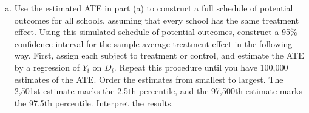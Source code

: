 \documentclass[11pt,notitlepage]{article}\usepackage[]{graphicx}\usepackage[]{color}
\makeatletter
\newenvironment{kframe}{%
 \def\at@end@of@kframe{}%
 \ifinner\ifhmode%
  \def\at@end@of@kframe{\end{minipage}}%
  \begin{minipage}{\columnwidth}%
 \fi\fi%
 \def\FrameCommand##1{\hskip\@totalleftmargin \hskip-\fboxsep
 \colorbox{shadecolor}{##1}\hskip-\fboxsep
     \hskip-\linewidth \hskip-\@totalleftmargin \hskip\columnwidth}%
 \MakeFramed {\advance\hsize-\width
   \@totalleftmargin\z@ \linewidth\hsize
   \@setminipage}}%
 {\par\unskip\endMakeFramed%
 \at@end@of@kframe}
\newenvironment{knitrout}{}{} %
\makeatother
\begin{document}
\begin{enumerate}[a)]
\begin{knitrout}
\begin{kframe}
\begin{Verbatim}[commandchars=\\\{\}]
    \end{Verbatim}

    \begin{Verbatim}[commandchars=\\\{\}]
{\color{incolor}In [{\color{incolor}12}]:} \PY{c+c1}{//}\PY{c+c1}{a}\PY{c+c1}{t}\PY{c+c1}{e}\PY{c+c1}{\PYZus{}}\PY{c+c1}{c}\PY{c+c1}{o}\PY{c+c1}{v}
         \PY{k}{di} \PY{n+nf}{r}(obsvStat)
\end{Verbatim}

    \begin{Verbatim}[commandchars=\\\{\}]
5.3155362

    \end{Verbatim}

    \begin{Verbatim}[commandchars=\\\{\}]
{\color{incolor}In [{\color{incolor}13}]:} \PY{c+c1}{//}\PY{c+c1}{ }\PY{c+c1}{p}\PY{c+c1}{.}\PY{c+c1}{v}\PY{c+c1}{a}\PY{c+c1}{l}\PY{c+c1}{u}\PY{c+c1}{e}\PY{c+c1}{\PYZus{}}\PY{c+c1}{c}\PY{c+c1}{o}\PY{c+c1}{v}
         \PY{k}{di} \PY{n+nf}{r}(twotail)
\end{Verbatim}

    \begin{Verbatim}[commandchars=\\\{\}]
.00289971

    \end{Verbatim}
\end{kframe}
\end{knitrout}

We again use a two-tailed test in order to evaluate the null hypothesis that the treatment has no effect for any subject.  We find a two-tailed p-value of 0.003, which leads us to reject the null hypothesis in favor of the alternative hypothesis that the treatment has some effect.

\item Use the estimated ATE in part (a) to construct a full schedule of potential outcomes for all schools, assuming that every school has the same treatment effect. Using this simulated schedule of potential outcomes, construct a 95\% confidence interval for the sample average treatment effect in the following way. First, assign each subject to treatment or control, and estimate the ATE by a regression of $Y_i$ on $D_i$. Repeat this procedure until you have 100,000 estimates of the ATE.  Order the estimates from smallest to largest. The 2,501st estimate marks the 2.5th percentile, and the 97,500th estimate marks the 97.5th percentile. Interpret the results.


\end{enumerate}
\end{document}
